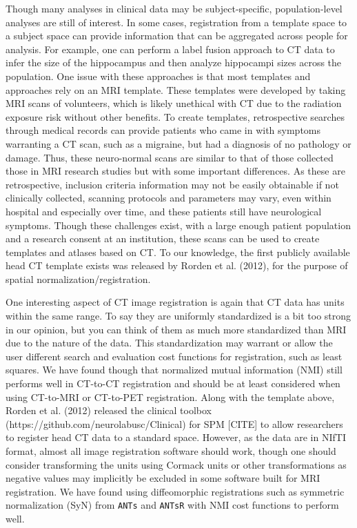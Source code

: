\documentclass[]{elsarticle} %
\begin{document}
Though many analyses in clinical data may be subject-specific,
population-level analyses are still of interest. In some cases,
registration from a template space to a subject space can provide
information that can be aggregated across people for analysis. For
example, one can perform a label fusion approach to CT data to infer the
size of the hippocampus and then analyze hippocampi sizes across the
population. One issue with these approaches is that most templates and
approaches rely on an MRI template. These templates were developed by
taking MRI scans of volunteers, which is likely unethical with CT due to
the radiation exposure risk without other benefits. To create templates,
retrospective searches through medical records can provide patients who
came in with symptoms warranting a CT scan, such as a migraine, but had
a diagnosis of no pathology or damage. Thus, these neuro-normal scans
are similar to that of those collected those in MRI research studies but
with some important differences. As these are retrospective, inclusion
criteria information may not be easily obtainable if not clinically
collected, scanning protocols and parameters may vary, even within
hospital and especially over time, and these patients still have
neurological symptoms. Though these challenges exist, with a large
enough patient population and a research consent at an institution,
these scans can be used to create templates and atlases based on CT. To
our knowledge, the first publicly available head CT template exists was
released by Rorden et al. (2012), for the purpose of spatial
normalization/registration.

One interesting aspect of CT image registration is again that CT data
has units within the same range. To say they are uniformly standardized
is a bit too strong in our opinion, but you can think of them as much
more standardized than MRI due to the nature of the data. This
standardization may warrant or allow the user different search and
evaluation cost functions for registration, such as least squares. We
have found though that normalized mutual information (NMI) still
performs well in CT-to-CT registration and should be at least considered
when using CT-to-MRI or CT-to-PET registration. Along with the template
above, Rorden et al. (2012) released the clinical toolbox
(https://github.com/neurolabusc/Clinical) for SPM {[}CITE{]} to allow
researchers to register head CT data to a standard space. However, as
the data are in NIfTI format, almost all image registration software
should work, though one should consider transforming the units using
Cormack units or other transformations as negative values may implicitly
be excluded in some software built for MRI registration. We have found
using diffeomorphic registrations such as symmetric normalization (SyN)
from \texttt{ANTs} and \texttt{ANTsR} with NMI cost functions to perform
well.
\end{document}

